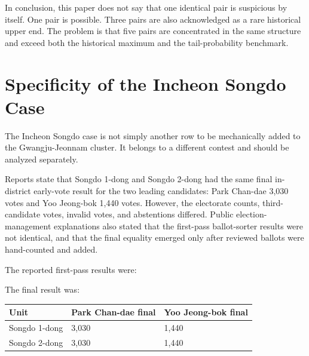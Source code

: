 \documentclass[preprint]{../ieie/IEIE}
\begin{document}
In conclusion, this paper does not say that one identical pair is suspicious by itself. One pair is possible. Three pairs are also acknowledged as a rare historical upper end. The problem is that five pairs are concentrated in the same structure and exceed both the historical maximum and the tail-probability benchmark.

\section{Specificity of the Incheon Songdo Case}

The Incheon Songdo case is not simply another row to be mechanically added to the Gwangju-Jeonnam cluster. It belongs to a different contest and should be analyzed separately.

Reports state that Songdo 1-dong and Songdo 2-dong had the same final in-district early-vote result for the two leading candidates: Park Chan-dae 3,030 votes and Yoo Jeong-bok 1,440 votes. However, the electorate counts, third-candidate votes, invalid votes, and abstentions differed. Public election-management explanations also stated that the first-pass ballot-sorter results were not identical, and that the final equality emerged only after reviewed ballots were hand-counted and added.

The reported first-pass results were:

\begin{center}
\scriptsize
{}
\end{center}

The final result was:

\begin{center}
\small
\begin{tabular}{l l l}
\toprule
Unit & Park Chan-dae final & Yoo Jeong-bok final \\
\midrule
Songdo 1-dong & 3,030 & 1,440 \\
Songdo 2-dong & 3,030 & 1,440 \\
\bottomrule
\end{tabular}
\end{center}
\end{document}

